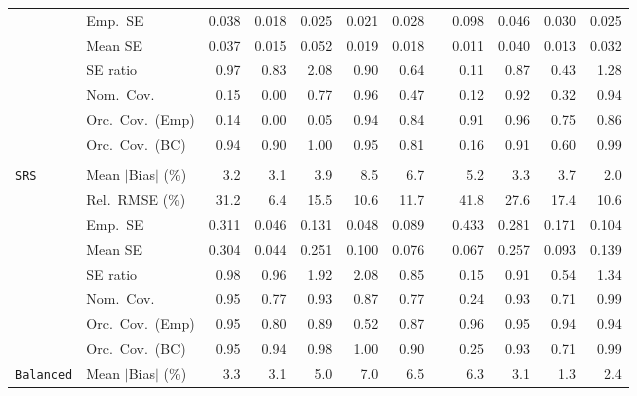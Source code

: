 \begin{landscape}
\begin{longtable}{llrrrrrrrrrr}
 & Emp.\ SE & 0.038 & 0.018 & 0.025 & 0.021 & 0.028 &  & 0.098 & 0.046 & 0.030 & 0.025 \\
 & Mean SE & 0.037 & 0.015 & 0.052 & 0.019 & 0.018 &  & 0.011 & 0.040 & 0.013 & 0.032 \\
 & SE ratio & \cellcolor{rankone}0.97 & 0.83 & 2.08 & \cellcolor{ranktwo}0.90 & 0.64 &  & 0.11 & \cellcolor{rankthree}0.87 & 0.43 & 1.28 \\
 & Nom.\ Cov. & 0.15 & 0.00 & 0.77 & \cellcolor{rankone}0.96 & 0.47 &  & 0.12 & \cellcolor{rankthree}0.92 & 0.32 & \cellcolor{ranktwo}0.94 \\
 & Orc.\ Cov.\ (Emp) & 0.14 & 0.00 & 0.05 & \cellcolor{rankone}0.94 & 0.84 &  & \cellcolor{rankthree}0.91 & \cellcolor{ranktwo}0.96 & 0.75 & 0.86 \\
 & Orc.\ Cov.\ (BC) & \cellcolor{ranktwo}0.94 & 0.90 & 1.00 & \cellcolor{rankone}0.95 & 0.81 &  & 0.16 & \cellcolor{rankthree}0.91 & 0.60 & 0.99 \\
\addlinespace[2pt]
\multicolumn{12}{l}{\textbf{Binary \& Categorical Phase-One Covariates}} \\
\addlinespace[2pt]
\quad \texttt{SRS} & Mean $|$Bias$|$ (\%) & \cellcolor{rankthree}3.2 & \cellcolor{ranktwo}3.1 & 3.9 & 8.5 & 6.7 &  & 5.2 & 3.3 & 3.7 & \cellcolor{rankone}2.0 \\
 & Rel.\ RMSE (\%) & 31.2 & \cellcolor{rankone}6.4 & 15.5 & \cellcolor{rankthree}10.6 & 11.7 &  & 41.8 & 27.6 & 17.4 & \cellcolor{ranktwo}10.6 \\
 & Emp.\ SE & 0.311 & 0.046 & 0.131 & 0.048 & 0.089 &  & 0.433 & 0.281 & 0.171 & 0.104 \\
 & Mean SE & 0.304 & 0.044 & 0.251 & 0.100 & 0.076 &  & 0.067 & 0.257 & 0.093 & 0.139 \\
 & SE ratio & \cellcolor{rankone}0.98 & \cellcolor{ranktwo}0.96 & 1.92 & 2.08 & 0.85 &  & 0.15 & \cellcolor{rankthree}0.91 & 0.54 & 1.34 \\
 & Nom.\ Cov. & \cellcolor{rankone}0.95 & 0.77 & \cellcolor{ranktwo}0.93 & 0.87 & 0.77 &  & 0.24 & \cellcolor{rankthree}0.93 & 0.71 & 0.99 \\
 & Orc.\ Cov.\ (Emp) & \cellcolor{rankone}0.95 & 0.80 & 0.89 & 0.52 & 0.87 &  & 0.96 & \cellcolor{ranktwo}0.95 & \cellcolor{rankthree}0.94 & 0.94 \\
 & Orc.\ Cov.\ (BC) & \cellcolor{rankone}0.95 & \cellcolor{ranktwo}0.94 & 0.98 & 1.00 & 0.90 &  & 0.25 & \cellcolor{rankthree}0.93 & 0.71 & 0.99 \\
\addlinespace[2pt]
\quad \texttt{Balanced} & Mean $|$Bias$|$ (\%) & 3.3 & \cellcolor{rankthree}3.1 & 5.0 & 7.0 & 6.5 &  & 6.3 & 3.1 & \cellcolor{rankone}1.3 & \cellcolor{ranktwo}2.4 \\

\end{longtable}
\end{landscape}
